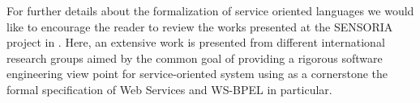 For further details about the formalization of service oriented languages we would like to encourage the reader to review the works presented at the SENSORIA project in \cite{Wirsing2011bis}. Here, an extensive work is presented from different international research groups aimed by the common goal of providing a rigorous software engineering view point for service-oriented system using as a cornerstone the formal specification of Web Services and WS-BPEL in particular.%



